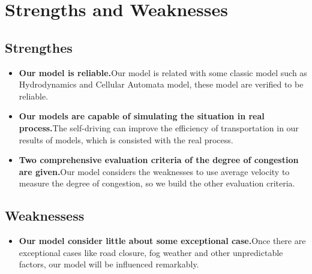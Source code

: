 \documentclass[UTF8]{mcmthesis}
\begin{document}
\section{Strengths and Weaknesses}
\subsection{Strengthes}
\begin{itemize}
\item{\textbf{Our model is reliable.}Our model is related with some classic model such as Hydrodynamics and Cellular Automata model, these model are verified to be reliable.}
\end{itemize}
\begin{itemize}
\item{\textbf{Our models are capable of simulating the situation in real process.}The self-driving can improve the efficiency of transportation in our results of models, which is consisted with the real process.}
\end{itemize}
\begin{itemize}
\item{\textbf{Two comprehensive evaluation criteria of the degree of congestion are given.}Our model considers the weaknesses to use average velocity to measure the degree of congestion, so we build the other evaluation criteria.}
\end{itemize}

\subsection{Weaknessess}

\begin{itemize}
\item{\textbf{Our model consider little about some exceptional case.}Once there are exceptional cases like road closure, fog weather and other unpredictable factors, our model will be influenced remarkably.}
\end{itemize}
\newpage
\end{document}
